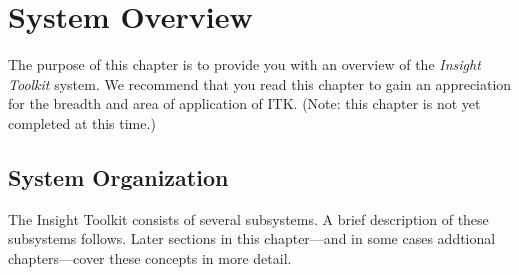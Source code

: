 \chapter{System Overview}
\label{chapter:SystemOverview}

The purpose of this chapter is to provide you with an overview of the
\emph{Insight Toolkit} system. We recommend that you read this chapter to
gain an appreciation for the breadth and area of application of ITK.
(Note: this chapter is not yet completed at this time.)

\section{System Organization}
\label{sec:SystemOrganization}

The Insight Toolkit consists of several subsystems. A brief
description of these subsystems follows. Later sections in this chapter---and
in some cases addtional chapters---cover these concepts in more detail. 

